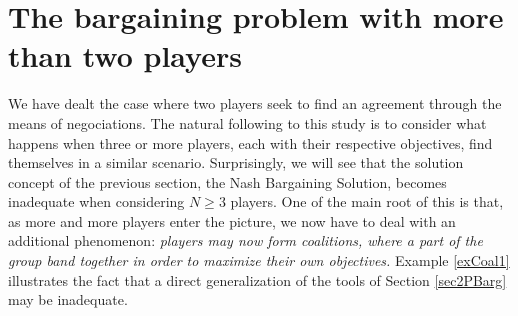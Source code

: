 \section{The bargaining problem with more than two players}


We have dealt the case where two players seek to find an agreement through the means of negociations. The natural following to this study is to consider what happens when three or more players, each with their respective objectives, find themselves in a similar scenario. Surprisingly, we will see that the solution concept of the previous section, the Nash Bargaining Solution, becomes inadequate when considering $N \geq 3$ players. One of the main root of this is that, as more and more players enter the picture, we now have to deal with an additional phenomenon: \emph{players may now form coalitions, where a part of the group band together in order to maximize their own objectives.}
Example \ref{exCoal1} illustrates the fact that a direct generalization of the tools of Section \ref{sec2PBarg} may be inadequate.

